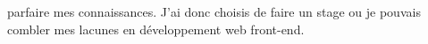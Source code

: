 \documentclass[a4paper, 11pt, french]{report}
\begin{document}
                                                                                                                                   parfaire
                                                                                                                                   mes
                                                                                                                                   connaissances.
                                                                                                                                   \newline
                                                                                                                                   J'ai
                                                                                                                                   donc
                                                                                                                                   choisis
                                                                                                                                   de
                                                                                                                                   faire
                                                                                                                                   un
                                                                                                                                   stage
                                                                                                                                   ou
                                                                                                                                   je
                                                                                                                                   pouvais
                                                                                                                                   combler
                                                                                                                                   mes
                                                                                                                                   lacunes
                                                                                                                                   en
                                                                                                                                   développement
                                                                                                                                   web
                                                                                                                                   front-end.
                                                                                                                                   \newline
\end{document}

